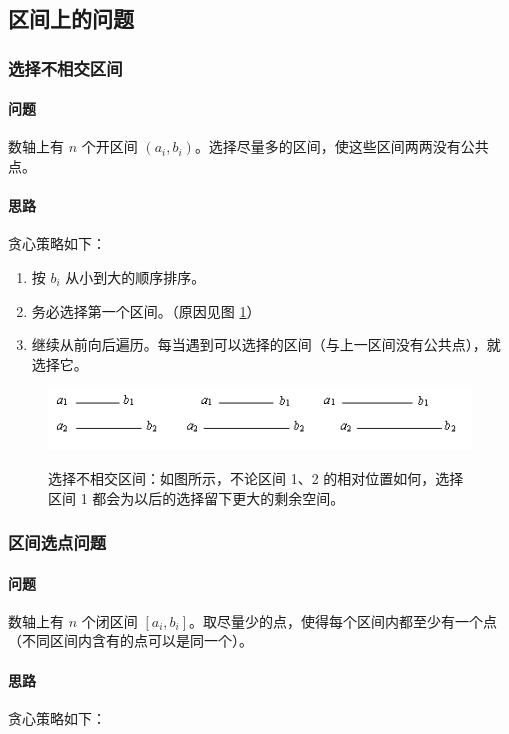 \subsection{区间上的问题}

\subsubsection{选择不相交区间}
	\paragraph{问题} 数轴上有 $n$ 个开区间  $(a_i,b_i)$。选择尽量多的区间，使这些区间两两没有公共点。
	
	\paragraph{思路} 贪心策略如下：
	
	\begin{enumerate}
		\item 按 $b_i$ 从小到大的顺序排序。
		\item 务必选择第一个区间。（原因见图 \ref{fig:ch1_tx_qjsdwt_1}）
		\item 继续从前向后遍历。每当遇到可以选择的区间（与上一区间没有公共点），就选择它。
	\end{enumerate}
	
	\begin{figure}[htb]
		\centering
		\includegraphics{ch1/figures/选择不相交区间.png}
		\label{fig:ch1_tx_qjsdwt_1}
		\caption{选择不相交区间：如图所示，不论区间 1、2 的相对位置如何，选择区间 1 都会为以后的选择留下更大的剩余空间。}
	\end{figure}

\subsubsection{区间选点问题}
	\paragraph{问题} 数轴上有 $n$ 个闭区间 $[a_i, b_i]$。取尽量少的点，使得每个区间内都至少有一个点（不同区间内含有的点可以是同一个）。
	
	\paragraph{思路} 贪心策略如下：
	
